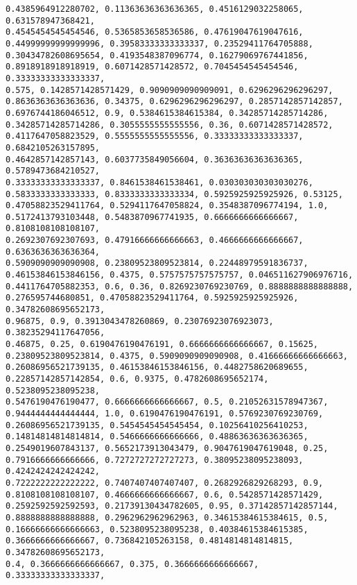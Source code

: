 \documentclass[11pt]{article}
\begin{document}
\begin{Verbatim}[commandchars=\\\{\}]
0.4385964912280702, 0.11363636363636365, 0.4516129032258065, 0.631578947368421,
0.4545454545454546, 0.5365853658536586, 0.47619047619047616,
0.44999999999999996, 0.39583333333333337, 0.23529411764705888,
0.30434782608695654, 0.4193548387096774, 0.16279069767441856,
0.8918918918918919, 0.6071428571428572, 0.7045454545454546, 0.33333333333333337,
0.575, 0.1428571428571429, 0.9090909090909091, 0.6296296296296297,
0.8636363636363636, 0.34375, 0.6296296296296297, 0.2857142857142857,
0.6976744186046512, 0.9, 0.5384615384615384, 0.34285714285714286,
0.34285714285714286, 0.3055555555555556, 0.36, 0.6071428571428572,
0.4117647058823529, 0.5555555555555556, 0.33333333333333337, 0.6842105263157895,
0.4642857142857143, 0.6037735849056604, 0.36363636363636365, 0.5789473684210527,
0.33333333333333337, 0.8461538461538461, 0.030303030303030276,
0.5833333333333333, 0.8333333333333334, 0.5925925925925926, 0.53125,
0.47058823529411764, 0.5294117647058824, 0.3548387096774194, 1.0,
0.5172413793103448, 0.5483870967741935, 0.6666666666666667, 0.8108108108108107,
0.2692307692307693, 0.47916666666666663, 0.4666666666666667, 0.6363636363636364,
0.5909090909090908, 0.23809523809523814, 0.22448979591836737,
0.46153846153846156, 0.4375, 0.5757575757575757, 0.046511627906976716,
0.4411764705882353, 0.6, 0.36, 0.8269230769230769, 0.8888888888888888,
0.276595744680851, 0.47058823529411764, 0.5925925925925926, 0.34782608695652173,
0.96875, 0.9, 0.3913043478260869, 0.23076923076923073, 0.38235294117647056,
0.46875, 0.25, 0.6190476190476191, 0.6666666666666667, 0.15625,
0.23809523809523814, 0.4375, 0.5909090909090908, 0.41666666666666663,
0.26086956521739135, 0.46153846153846156, 0.4482758620689655,
0.22857142857142854, 0.6, 0.9375, 0.4782608695652174, 0.5238095238095238,
0.5476190476190477, 0.6666666666666667, 0.5, 0.21052631578947367,
0.9444444444444444, 1.0, 0.6190476190476191, 0.5769230769230769,
0.26086956521739135, 0.5454545454545454, 0.10256410256410253,
0.14814814814814814, 0.5466666666666666, 0.48863636363636365,
0.2549019607843137, 0.5652173913043479, 0.9047619047619048, 0.25,
0.7916666666666666, 0.7272727272727273, 0.38095238095238093, 0.4242424242424242,
0.7222222222222222, 0.7407407407407407, 0.2682926829268293, 0.9,
0.8108108108108107, 0.4666666666666667, 0.6, 0.5428571428571429,
0.2592592592592593, 0.21739130434782605, 0.95, 0.37142857142857144,
0.8888888888888888, 0.2962962962962963, 0.34615384615384615, 0.5,
0.16666666666666663, 0.5238095238095238, 0.40384615384615385,
0.3666666666666667, 0.736842105263158, 0.4814814814814815, 0.34782608695652173,
0.4, 0.3666666666666667, 0.375, 0.3666666666666667, 0.33333333333333337,

\end{Verbatim}
\end{document}
